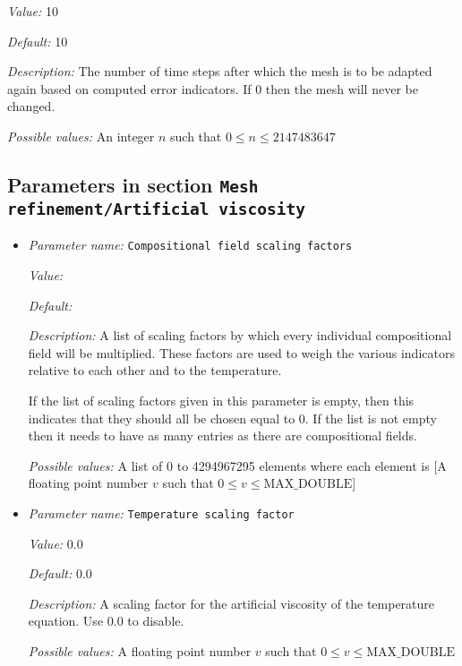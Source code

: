 \begin{itemize}
{\it Value:} 10


{\it Default:} 10


{\it Description:} The number of time steps after which the mesh is to be adapted again based on computed error indicators. If 0 then the mesh will never be changed.


{\it Possible values:} An integer $n$ such that $0\leq n \leq 2147483647$
\end{itemize}



\subsection{Parameters in section \tt Mesh refinement/Artificial viscosity}
\label{parameters:Mesh_20refinement/Artificial_20viscosity}

\begin{itemize}
\item {\it Parameter name:} {\tt Compositional field scaling factors}
\label{parameters:Mesh refinement/Artificial viscosity/Compositional field scaling factors}
\label{parameters:Mesh_20refinement/Artificial_20viscosity/Compositional_20field_20scaling_20factors}


{\it Value:} 


{\it Default:} 


{\it Description:} A list of scaling factors by which every individual compositional field will be multiplied. These factors are used to weigh the various indicators relative to each other and to the temperature. 

If the list of scaling factors given in this parameter is empty, then this indicates that they should all be chosen equal to 0. If the list is not empty then it needs to have as many entries as there are compositional fields.


{\it Possible values:} A list of 0 to 4294967295 elements where each element is [A floating point number $v$ such that $0 \leq v \leq \text{MAX\_DOUBLE}$]
\item {\it Parameter name:} {\tt Temperature scaling factor}
\label{parameters:Mesh refinement/Artificial viscosity/Temperature scaling factor}
\label{parameters:Mesh_20refinement/Artificial_20viscosity/Temperature_20scaling_20factor}


{\it Value:} 0.0


{\it Default:} 0.0


{\it Description:} A scaling factor for the artificial viscosity  of the temperature equation. Use 0.0 to disable.


{\it Possible values:} A floating point number $v$ such that $0 \leq v \leq \text{MAX\_DOUBLE}$
\end{itemize}

